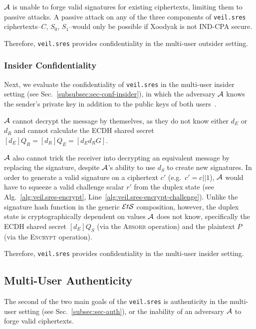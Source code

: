 $\mathcal{A}$ is unable to forge valid signatures for existing ciphertexts, limiting them to passive attacks.
A passive attack on any of the three components of \texttt{veil.sres} ciphertexts--$C$, $S_0$, $S_1$--would only be
possible if Xoodyak is not IND-CPA secure.

Therefore, \texttt{veil.sres} provides confidentiality in the multi-user outsider setting.

\subsubsection{Insider Confidentiality}

Next, we evaluate the confidentiality of \texttt{veil.sres} in the multi-user insider setting
(see Sec.~\ref{subsubsec:sec-conf-insider}), in which the adversary $\mathcal{A}$ knows the sender's private key in
addition to the public keys of both users~\cite[p. 45--46]{baek2010}.

$\mathcal{A}$ cannot decrypt the message by themselves, as they do not know either $d_E$ or $d_R$ and cannot calculate
the ECDH shared secret $[d_E]Q_R=[d_R]Q_E=[d_E{d_R}G]$.

$\mathcal{A}$ also cannot trick the receiver into decrypting an equivalent message by replacing the signature, despite
$\mathcal{A}$'s ability to use $d_S$ to create new signatures.
In order to generate a valid signature on a ciphertext $c'$ (e.g.\ $c'=c||1$), $\mathcal{A}$ would have to squeeze a
valid challenge scalar $r'$ from the duplex state (see Alg.~\ref{alg:veil.sres-encrypt},
Line~\ref{alg:veil.sres-encrypt-challenge}).
Unlike the signature hash function in the generic $\mathcal{E}t\mathcal{S}$ composition, however, the duplex state is cryptographically
dependent on values $\mathcal{A}$ does not know, specifically the ECDH shared secret $[d_E]Q_S$ (via the \textsc{Absorb}
operation) and the plaintext $P$ (via the \textsc{Encrypt} operation).

Therefore, \texttt{veil.sres} provides confidentiality in the multi-user insider setting.

\subsection{Multi-User Authenticity}\label{subsec:veil.sres-auth}

The second of the two main goals of the \texttt{veil.sres} is authenticity in the multi-user setting
(see Sec.~\ref{subsec:sec-auth}), or the inability of an adversary $\mathcal{A}$ to forge valid ciphertexts.

